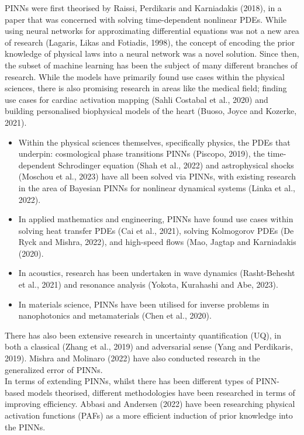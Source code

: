 \documentclass[12pt, openany]{book}
\begin{document}
PINNs were first theorised by Raissi, Perdikaris and Karniadakis (2018), in a paper that was concerned with solving time-dependent nonlinear PDEs. While using neural networks for approximating differential equations was not a new area of research (Lagaris, Likas and Fotiadis, 1998), the concept of encoding the prior knowledge of physical laws into a neural network was a novel solution. Since then, the subset of machine learning has been the subject of many different branches of research. While the models have primarily found use cases within the physical sciences, there is also promising research in areas like the medical field; finding use cases for cardiac activation mapping (Sahli Costabal et al., 2020) and building personalised biophysical models of the heart (Buoso, Joyce and Kozerke, 2021).

\begin{itemize}
    \item Within the physical sciences themselves, specifically physics, the PDEs that underpin: cosmological phase transitions PINNs (Piscopo, 2019), the time-dependent Schrodinger equation (Shah et al., 2022) and astrophysical shocks (Moschou et al., 2023) have all been solved via PINNs, with existing research in the area of Bayesian PINNs for nonlinear dynamical systems (Linka et al., 2022).
    \item In applied mathematics and engineering, PINNs have found use cases within solving heat transfer PDEs (Cai et al., 2021), solving Kolmogorov PDEs (De Ryck and Mishra, 2022), and high-speed flows (Mao, Jagtap and Karniadakis (2020).
    \item In acoustics, research has been undertaken in wave dynamics (Rasht-Behesht et al., 2021) and resonance analysis (Yokota, Kurahashi and Abe, 2023).
    \item In materials science, PINNs have been utilised for inverse problems in nanophotonics and metamaterials (Chen et al., 2020).
\end{itemize}

There has also been extensive research in uncertainty quantification (UQ), in both a classical (Zhang et al., 2019) and adversarial sense (Yang and Perdikaris, 2019). Mishra and Molinaro (2022) have also conducted research in the generalized error of PINNs. \\

In terms of extending PINNs, whilst there has been different types of PINN-based models theorised, different methodologies have been researched in terms of improving efficiency. Abbasi and Andersen (2022) have been researching physical activation functions (PAFs) as a more efficient induction of prior knowledge into the PINNs.
\end{document}
